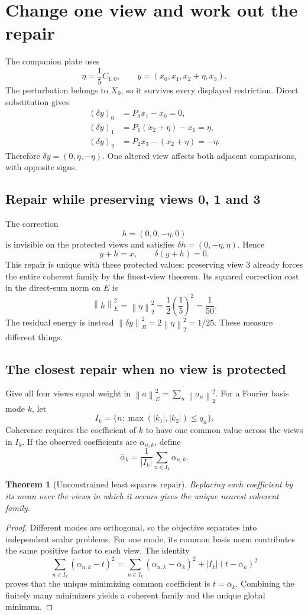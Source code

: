 \documentclass[11pt]{article}
\newtheorem{theorem}{Theorem}[section]
\theoremstyle{definition}
\theoremstyle{remark}
\newcommand{\norm}[1]{\left\lVert #1\right\rVert}
\begin{document}
\section{Change one view and work out the repair}
\label{sec:repair}
The companion plate uses
\[
 \eta=\frac15C_{1,0},\qquad
 y=(x_0,x_1,x_2+\eta,x_3).
\]
The perturbation belongs to $X_0$, so it survives every displayed restriction. Direct substitution gives
\begin{align*}
 (\delta y)_0&=P_0x_1-x_0=0,\\
 (\delta y)_1&=P_1(x_2+\eta)-x_1=\eta,\\
 (\delta y)_2&=P_2x_3-(x_2+\eta)=-\eta.
\end{align*}
Therefore $\delta y=(0,\eta,-\eta)$. One altered view affects both adjacent comparisons, with opposite signs.

\subsection{Repair while preserving views 0, 1 and 3}
The correction
\[
 h=(0,0,-\eta,0)
\]
is invisible on the protected views and satisfies $\delta h=(0,-\eta,\eta)$. Hence
\[
 y+h=x,\qquad \delta(y+h)=0.
\]
This repair is unique with these protected values: preserving view 3 already forces the entire coherent family by the finest-view theorem. Its squared correction cost in the direct-sum norm on $E$ is
\[
 \norm{h}_E^2=\norm{\eta}_2^2=\frac12\left(\frac15\right)^2=\frac1{50}.
\]
The residual energy is instead $\norm{\delta y}_R^2=2\norm{\eta}_2^2=1/25$. These measure different things.

\subsection{The closest repair when no view is protected}
Give all four views equal weight in $\norm{a}_E^2=\sum_n\norm{a_n}_2^2$. For a Fourier basis mode $k$, let
\[
 I_k=\{n:\max(|k_1|,|k_2|)\leq q_n\}.
\]
Coherence requires the coefficient of $k$ to have one common value across the views in $I_k$. If the observed coefficients are $\alpha_{n,k}$, define
\[
 \bar\alpha_k=\frac1{|I_k|}\sum_{n\in I_k}\alpha_{n,k}.
\]
\begin{theorem}[Unconstrained least squares repair]
Replacing each coefficient by its mean over the views in which it occurs gives the unique nearest coherent family.
\end{theorem}
\begin{proof}
Different modes are orthogonal, so the objective separates into independent scalar problems. For one mode, its common basis norm contributes the same positive factor to each view. The identity
\[
 \sum_{n\in I_k}(\alpha_{n,k}-t)^2
 =\sum_{n\in I_k}(\alpha_{n,k}-\bar\alpha_k)^2
  +|I_k|(t-\bar\alpha_k)^2
\]
proves that the unique minimizing common coefficient is $t=\bar\alpha_k$. Combining the finitely many minimizers yields a coherent family and the unique global minimum.
\end{proof}
\end{document}
